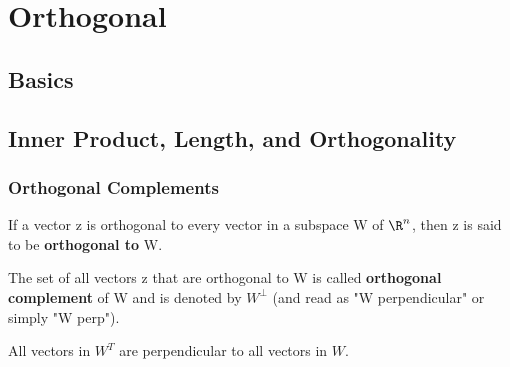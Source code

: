 \chapter{Orthogonal}

\section{Basics}



\section{Inner Product, Length, and Orthogonality}

\subsection{Orthogonal Complements}

\begin{definition}

    If a vector z is orthogonal to every vector in a subspace W of \(\R^n\), then z is said to be \textbf{orthogonal to} W. 
    
    The set of all vectors z that are orthogonal to W is called \textbf{orthogonal complement} of W and is denoted by \(W^{\perp}\) (and read as "W perpendicular" or simply "W perp").   
\end{definition}

\begin{note}
    All vectors in \(W^{T}\) are perpendicular to all vectors in \(W\).  
\end{note}

